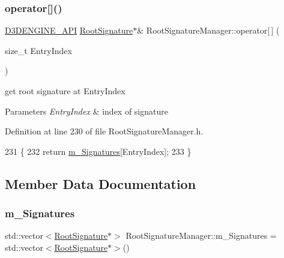 \subsubsection{\texorpdfstring{operator[]()}{operator[]()}}
{\footnotesize\ttfamily \mbox{\hyperlink{stdafx_8h_a8ee2d990c5dfba7794dd2b60741d7722}{D3\+D\+E\+N\+G\+I\+N\+E\+\_\+\+A\+PI}} \mbox{\hyperlink{class_root_signature}{Root\+Signature}}$\ast$\& Root\+Signature\+Manager\+::operator\mbox{[}$\,$\mbox{]} (\begin{DoxyParamCaption}\item[{size\+\_\+t}]{Entry\+Index }\end{DoxyParamCaption})\hspace{0.3cm}{\ttfamily [inline]}}



get root signature at Entry\+Index 


\begin{DoxyParams}{Parameters}
{\em Entry\+Index} & index of signature \\
\hline
\end{DoxyParams}


Definition at line 230 of file Root\+Signature\+Manager.\+h.


\begin{DoxyCode}
231     \{
232         \textcolor{keywordflow}{return} \mbox{\hyperlink{class_root_signature_manager_a7d766443fb0a3ba77585fc0a08cfee07}{m\_Signatures}}[EntryIndex];
233     \}
\end{DoxyCode}


\subsection{Member Data Documentation}
\mbox{\label{class_root_signature_manager_a7d766443fb0a3ba77585fc0a08cfee07}} 
\subsubsection{\texorpdfstring{m\+\_\+\+Signatures}{m\_Signatures}}
{\footnotesize\ttfamily std\+::vector$<$\mbox{\hyperlink{class_root_signature}{Root\+Signature}}$\ast$$>$ Root\+Signature\+Manager\+::m\+\_\+\+Signatures = std\+::vector$<$\mbox{\hyperlink{class_root_signature}{Root\+Signature}}$\ast$$>$()\hspace{0.3cm}{\ttfamily [private]}}



